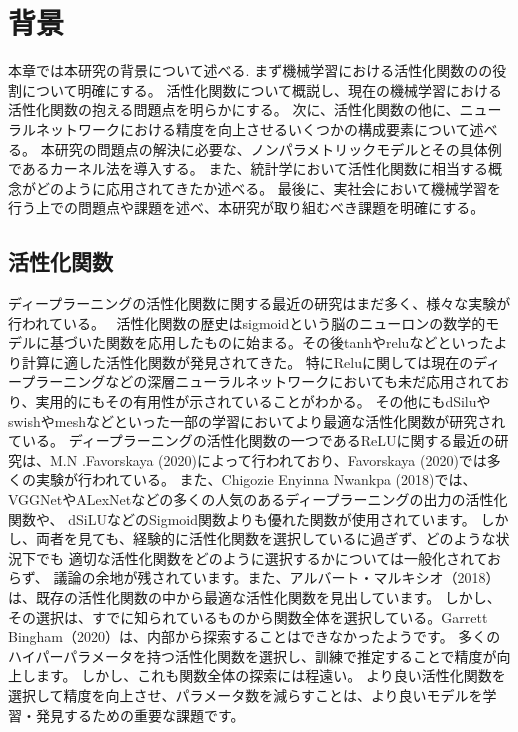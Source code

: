\chapter{背景}
\label{background}

本章では本研究の背景について述べる.
まず機械学習における活性化関数のの役割について明確にする。
活性化関数について概説し、現在の機械学習における活性化関数の抱える問題点を明らかにする。
次に、活性化関数の他に、ニューラルネットワークにおける精度を向上させるいくつかの構成要素について述べる。
本研究の問題点の解決に必要な、ノンパラメトリックモデルとその具体例であるカーネル法を導入する。
また、統計学において活性化関数に相当する概念がどのように応用されてきたか述べる。
最後に、実社会において機械学習を行う上での問題点や課題を述べ、本研究が取り組むべき課題を明確にする。



\section{活性化関数}

ディープラーニングの活性化関数に関する最近の研究はまだ多く、様々な実験が 行われている。~\cite{af_list}
活性化関数の歴史はsigmoidという脳のニューロンの数学的モデルに基づいた関数を応用したものに始まる。その後tanhやreluなどといったより計算に適した活性化関数が発見されてきた。
特にReluに関しては現在のディープラーニングなどの深層ニューラルネットワークにおいても未だ応用されており、実用的にもその有用性が示されていることがわかる。
その他にもdSiluやswishやmeshなどといった一部の学習においてより最適な活性化関数が研究されている。
ディープラーニングの活性化関数の一つであるReLUに関する最近の研究は、M.N .Favorskaya (2020)によって行われており、Favorskaya (2020)では多くの実験が行われている。
また、Chigozie Enyinna Nwankpa (2018)では、VGGNetやALexNetなどの多くの人気のあるディープラーニングの出力の活性化関数や、
dSiLUなどのSigmoid関数よりも優れた関数が使用されています。
しかし、両者を見ても、経験的に活性化関数を選択しているに過ぎず、どのような状況下でも 適切な活性化関数をどのように選択するかについては一般化されておらず、
議論の余地が残されています。また、アルバート・マルキシオ（2018）は、既存の活性化関数の中から最適な活性化関数を見出しています。
 しかし、その選択は、すでに知られているものから関数全体を選択している。Garrett Bingham（2020）は、内部から探索することはできなかったようです。
  多くのハイパーパラメータを持つ活性化関数を選択し、訓練で推定することで精度が向上します。 しかし、これも関数全体の探索には程遠い。
より良い活性化関数を選択して精度を向上させ、パラメータ数を減らすことは、より良いモデルを学習・発見するための重要な課題です。


